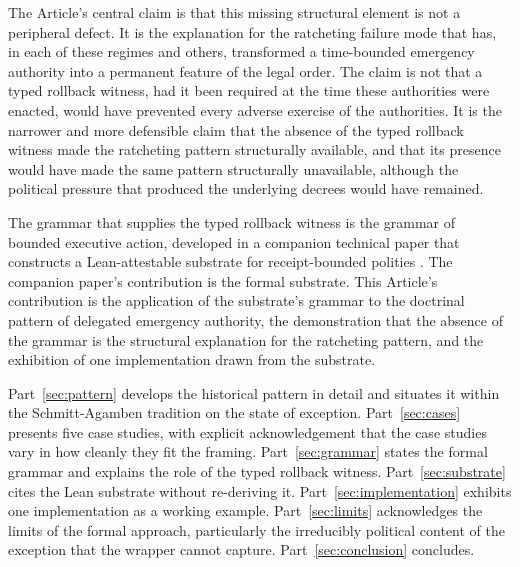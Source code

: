The Article's central claim is that this missing structural element is not a peripheral defect.
It is the explanation for the ratcheting failure mode that has, in each of these regimes and others,
transformed a time-bounded emergency authority into a permanent feature of the legal order.
The claim is not that a typed rollback witness, had it been required at the time these authorities were enacted,
would have prevented every adverse exercise of the authorities.
It is the narrower and more defensible claim that the absence of the typed rollback witness made the ratcheting
pattern structurally available, and that its presence would have made the same pattern structurally unavailable,
although the political pressure that produced the underlying decrees would have remained.

The grammar that supplies the typed rollback witness is the grammar of bounded executive action,
developed in a companion technical paper that constructs a Lean-attestable substrate for receipt-bounded
polities \cite{ref_chio_parent_paper}.
The companion paper's contribution is the formal substrate.
This Article's contribution is the application of the substrate's grammar to the doctrinal pattern of
delegated emergency authority,
the demonstration that the absence of the grammar is the structural explanation for the ratcheting pattern,
and the exhibition of one implementation drawn from the substrate.

Part~\ref{sec:pattern} develops the historical pattern in detail and situates it within the Schmitt-Agamben
tradition on the state of exception.
Part~\ref{sec:cases} presents five case studies, with explicit acknowledgement that the case studies vary in
how cleanly they fit the framing.
Part~\ref{sec:grammar} states the formal grammar and explains the role of the typed rollback witness.
Part~\ref{sec:substrate} cites the Lean substrate without re-deriving it.
Part~\ref{sec:implementation} exhibits one implementation as a working example.
Part~\ref{sec:limits} acknowledges the limits of the formal approach,
particularly the irreducibly political content of the exception that the wrapper cannot capture.
Part~\ref{sec:conclusion} concludes.
